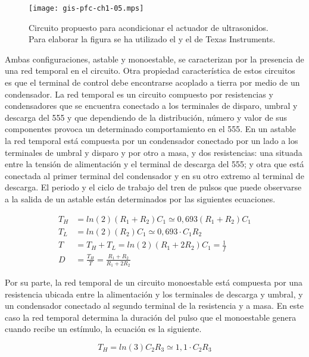 \begin{sidewaysfigure}
	\begin{center}
		\texttt{[image: gis-pfc-ch1-05.mps]}
	\end{center}
	\caption[Circuito acondicionador de la sección de emisión]{Circuito
	propuesto para acondicionar el actuador de ultrasonidos. Para
	elaborar la figura se ha utilizado el  y el 
	de Texas Instruments.}
	\label{fig:actuator-conditioner}
\end{sidewaysfigure}

Ambas configuraciones, astable y monoestable, se caracterizan por la
presencia de una red temporal en el circuito. Otra propiedad característica
de estos circuitos es que el terminal de control debe encontrarse acoplado
a tierra por medio de un condensador. La red temporal es un circuito
compuesto por resistencias y condensadores que se encuentra conectado a los
terminales de disparo, umbral y descarga del 555 y que dependiendo de la
distribución, número y valor de sus componentes provoca un determinado
comportamiento en el 555. En un astable la red temporal está compuesta por
un condensador conectado por un lado a los terminales de umbral y disparo y
por otro a masa, y dos resistencias: una situada entre la tensión de
alimentación y el terminal de descarga del 555; y otra que está conectada
al primer terminal del condensador y en su otro extremo al terminal de
descarga. El periodo y el ciclo de trabajo del tren de pulsos que puede
observarse a la salida de un astable están determinados por las siguientes
ecuaciones.

\begin{align}
	T_H &= ln(2)(R_1 + R_2)C_1 \simeq 0,693(R_1 + R_2)C_1 \\
	T_L &= ln(2)(R_2)C_1 \simeq 0,693\cdot C_1R_2 \\
	T &= T_H + T_L = ln(2)(R_1 + 2R_2)C_1 = \frac{1}{f} \\
	D &= \frac{T_H}{T} = \frac{R_1 + R_2}{R_1 + 2R_2}
	\label{eq:astable}
\end{align}

Por su parte, la red temporal de un circuito monoestable está compuesta por
una resistencia ubicada entre la alimentación y los terminales de descarga
y umbral, y un condensador conectado al segundo terminal de la resistencia
y a masa. En este caso la red temporal determina la duración del pulso que
el monoestable genera cuando recibe un estímulo, la ecuación es la
siguiente.

\begin{equation}
	T_H = ln(3)C_2R_3 \simeq 1,1\cdot C_2R_3
	\label{eq:monostable}
\end{equation}

